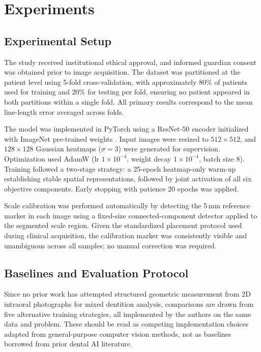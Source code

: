 \documentclass[conference]{IEEEtran}
\begin{document}
\section{Experiments}

\subsection{Experimental Setup}

The study received institutional ethical approval, and informed guardian consent was obtained
prior to image acquisition. The dataset was partitioned at the patient level using 5-fold
cross-validation, with approximately 80\% of patients used for training and 20\% for testing
per fold, ensuring no patient appeared in both partitions within a single fold. All primary
results correspond to the mean line-length error averaged across folds.

The model was implemented in PyTorch using a ResNet-50 encoder initialized with ImageNet
pre-trained weights \cite{he2016deep}. Input images were resized to $512{\times}512$, and
$128{\times}128$ Gaussian heatmaps ($\sigma=3$) were generated for supervision. Optimization
used AdamW (lr $1{\times}10^{-4}$, weight decay $1{\times}10^{-4}$, batch size 8). Training
followed a two-stage strategy: a 25-epoch heatmap-only warm-up establishing stable spatial
representations, followed by joint activation of all six objective components. Early stopping
with patience 20 epochs was applied.

Scale calibration was performed automatically by detecting the 5\,mm reference marker in each
image using a fixed-size connected-component detector applied to the segmented scale region.
Given the standardized placement protocol used during clinical acquisition, the calibration
marker was consistently visible and unambiguous across all samples; no manual correction was
required.

\subsection{Baselines and Evaluation Protocol}

Since no prior work has attempted structured geometric measurement from 2D intraoral photographs
for mixed dentition analysis, comparisons are drawn from five alternative training strategies,
all implemented by the authors on the same data and problem. These should be read as competing
implementation choices adapted from general-purpose computer vision methods, not as baselines
borrowed from prior dental AI literature.
\end{document}
